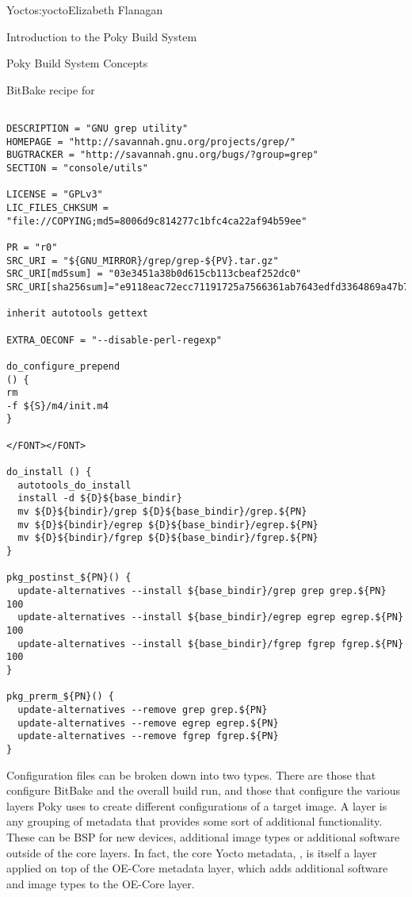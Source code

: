 \begin{aosachapter}{Yocto}{s:yocto}{Elizabeth Flanagan}
\begin{aosasect1}{Introduction to the Poky Build System}
\begin{aosasect2}{Poky Build System Concepts}
\begin{aosabox}{BitBake recipe for }

\begin{verbatim}

DESCRIPTION = "GNU grep utility"
HOMEPAGE = "http://savannah.gnu.org/projects/grep/"
BUGTRACKER = "http://savannah.gnu.org/bugs/?group=grep"
SECTION = "console/utils"

LICENSE = "GPLv3"
LIC_FILES_CHKSUM = "file://COPYING;md5=8006d9c814277c1bfc4ca22af94b59ee"

PR = "r0"
SRC_URI = "${GNU_MIRROR}/grep/grep-${PV}.tar.gz"
SRC_URI[md5sum] = "03e3451a38b0d615cb113cbeaf252dc0"
SRC_URI[sha256sum]="e9118eac72ecc71191725a7566361ab7643edfd3364869a47b78dc934a357970"

inherit autotools gettext

EXTRA_OECONF = "--disable-perl-regexp"

do_configure_prepend
() {
rm
-f ${S}/m4/init.m4
}

</FONT></FONT>

do_install () {
  autotools_do_install
  install -d ${D}${base_bindir}
  mv ${D}${bindir}/grep ${D}${base_bindir}/grep.${PN}
  mv ${D}${bindir}/egrep ${D}${base_bindir}/egrep.${PN}
  mv ${D}${bindir}/fgrep ${D}${base_bindir}/fgrep.${PN}
}

pkg_postinst_${PN}() {
  update-alternatives --install ${base_bindir}/grep grep grep.${PN} 100
  update-alternatives --install ${base_bindir}/egrep egrep egrep.${PN} 100
  update-alternatives --install ${base_bindir}/fgrep fgrep fgrep.${PN} 100
}

pkg_prerm_${PN}() {
  update-alternatives --remove grep grep.${PN}
  update-alternatives --remove egrep egrep.${PN}
  update-alternatives --remove fgrep fgrep.${PN}
}
\end{verbatim}
\end{aosabox}

Configuration files can be broken down into two types. There are those that
configure BitBake and the overall build run, and those that configure
the various layers Poky uses to create different configurations of a
target image. A layer is any grouping of metadata that provides some
sort of additional functionality. These can be BSP for new devices,
additional image types or additional software outside of the core
layers. In fact, the core Yocto metadata, , is itself a
layer applied on top of the OE-Core metadata layer,  which adds
additional software and image types to the OE-Core layer.


\end{aosasect2}
\end{aosasect1}
\end{aosachapter}
